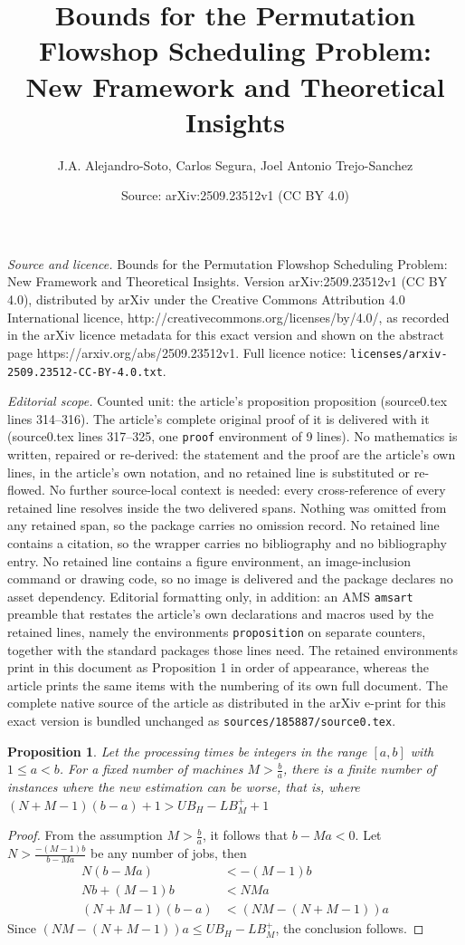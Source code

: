 \documentclass[10pt,a4paper]{amsart}
\title{Bounds for the Permutation Flowshop Scheduling Problem: New Framework and Theoretical Insights}
\author{J.A. Alejandro-Soto, Carlos Segura, Joel Antonio Trejo-Sanchez}
\date{Source: arXiv:2509.23512v1 (CC BY 4.0)}
\newtheorem{proposition}{Proposition}
\begin{document}
\maketitle

\noindent\emph{Source and licence.} Bounds for the Permutation Flowshop Scheduling Problem: New Framework and Theoretical Insights. Version arXiv:2509.23512v1 (CC BY 4.0), distributed by arXiv under the Creative Commons Attribution 4.0 International licence, http://creativecommons.org/licenses/by/4.0/, as recorded in the arXiv licence metadata for this exact version and shown on the abstract page https://arxiv.org/abs/2509.23512v1. Full licence notice: \texttt{licenses/arxiv-2509.23512-CC-BY-4.0.txt}.\par\smallskip

\noindent\textit{Editorial scope.} Counted unit: the article's proposition proposition (source0.tex lines 314--316). The article's complete original proof of it is delivered with it (source0.tex lines 317--325, one \texttt{proof} environment of 9 lines). No mathematics is written, repaired or re-derived: the statement and the proof are the article's own lines, in the article's own notation, and no retained line is substituted or re-flowed.  No further source-local context is needed: every cross-reference of every retained line resolves inside the two delivered spans.  Nothing was omitted from any retained span, so the package carries no omission record.  No retained line contains a citation, so the wrapper carries no bibliography and no bibliography entry.  No retained line contains a figure environment, an image-inclusion command or drawing code, so no image is delivered and the package declares no asset dependency.  Editorial formatting only, in addition: an AMS \texttt{amsart} preamble that restates the article's own declarations and macros used by the retained lines, namely the environments \texttt{proposition} on separate counters, together with the standard packages those lines need.  The retained environments print in this document as Proposition 1 in order of appearance, whereas the article prints the same items with the numbering of its own full document.  The complete native source of the article as distributed in the arXiv e-print for this exact version is bundled unchanged as \texttt{sources/185887/source0.tex}.
\begin{proposition}
Let the processing times be integers in the range $[a, b]$ with $1 \leq a < b$. For a fixed number of machines $M > \frac{b}{a}$, there is a finite number of instances where the new estimation can be worse, that is, where $(N + M - 1)(b - a) + 1 > UB_H - LB_M^+ + 1$
\end{proposition}

\begin{proof}
From the assumption $M > \frac{b}{a}$, it follows that $b - Ma < 0$. Let $N > \frac{-(M - 1)b}{b - Ma}$ be any number of jobs, then
\begin{align*}
N(b - Ma) &< -(M - 1)b\\
Nb + (M - 1)b &< NMa\\
(N + M  - 1)(b - a) &< (NM - (N + M - 1))a
\end{align*}
Since $(NM - (N + M - 1))a \leq UB_H - LB_M^+ $, the conclusion follows.  
\end{proof}
\end{document}
